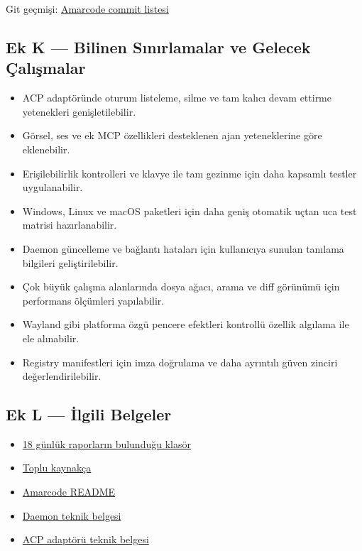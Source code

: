 \documentclass[
  turkish,
  10pt,
  a4paper,
]{article}
\providecommand{\tightlist}{%
  \setlength{\itemsep}{0pt}\setlength{\parskip}{0pt}}
\begin{document}
Git geçmişi:
\href{https://github.com/amar-jay/amarcode/commits/main/}{Amarcode
commit listesi}

\subsection{Ek K --- Bilinen Sınırlamalar ve Gelecek
Çalışmalar}\label{ek-k--bilinen-sux131nux131rlamalar-ve-gelecek-uxe7alux131ux15fmalar}

\begin{itemize}
\tightlist
\item
  ACP adaptöründe oturum listeleme, silme ve tam kalıcı devam ettirme
  yetenekleri genişletilebilir.
\item
  Görsel, ses ve ek MCP özellikleri desteklenen ajan yeteneklerine göre
  eklenebilir.
\item
  Erişilebilirlik kontrolleri ve klavye ile tam gezinme için daha
  kapsamlı testler uygulanabilir.
\item
  Windows, Linux ve macOS paketleri için daha geniş otomatik uçtan uca
  test matrisi hazırlanabilir.
\item
  Daemon güncelleme ve bağlantı hataları için kullanıcıya sunulan
  tanılama bilgileri geliştirilebilir.
\item
  Çok büyük çalışma alanlarında dosya ağacı, arama ve diff görünümü için
  performans ölçümleri yapılabilir.
\item
  Wayland gibi platforma özgü pencere efektleri kontrollü özellik
  algılama ile ele alınabilir.
\item
  Registry manifestleri için imza doğrulama ve daha ayrıntılı güven
  zinciri değerlendirilebilir.
\end{itemize}

\subsection{Ek L --- İlgili Belgeler}\label{ek-l--iux307lgili-belgeler}

\begin{itemize}
\tightlist
\item
  \href{https://github.com/amar-jay/amarcode/tree/main/reports}{18
  günlük raporların bulunduğu klasör}
\item
  \href{https://github.com/amar-jay/amarcode/blob/main/reports/KAYNAKCA.md}{Toplu
  kaynakça}
\item
  \href{https://github.com/amar-jay/amarcode/blob/main/README.md}{Amarcode
  README}
\item
  \href{https://github.com/amar-jay/amarcode/blob/main/crates/daemon/README.md}{Daemon
  teknik belgesi}
\item
  \href{https://github.com/amar-jay/amarcode/blob/main/crates/amarcode-acp/README.md}{ACP
  adaptörü teknik belgesi}
\end{itemize}
\end{document}
